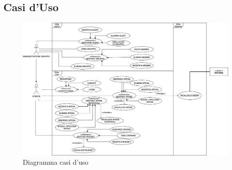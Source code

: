 \subsection{Casi d'Uso}

    \begin{figure}[h]
        \centering
        \includegraphics[width=1.1\textwidth, trim=3cm 0cm 1cm 0cm]{images/DiagrammaCasiDusoV1.2.png}
        \caption{Diagramma casi d'uso }
    \end{figure}

